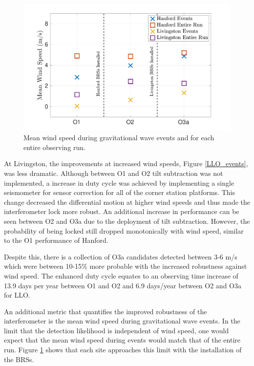 \documentclass [12pt, proquest]{uwthesis}[2019]
\begin{document}
\begin{figure}[!h]
\begin{center}
\includegraphics[width=\textwidth]{WindExpect.pdf}
\caption[Mean wind speed during GW events]{Mean wind speed during gravitational wave events and for each entire observing run.}
\label{WindExp}
\end{center}
\end{figure}

At Livingston, the improvements at increased wind speeds, Figure \ref{LLO_events}, was less dramatic. Although between O1 and O2 tilt subtraction was not implemented, a increase in duty cycle was achieved by implementing a single seismometer for sensor correction for all of the corner station platforms. This change decreased the differential motion at higher wind speeds and thus made the interferometer lock more robust. An additional increase in performance can be seen between O2 and O3a due to the deployment of tilt subtraction. However, the probability of being locked still dropped monotonically with wind speed, similar to the O1 performance of Hanford.

Despite this, there is a collection of O3a candidates detected between 3-6 m/s which were between 10-15\% more probable with the increased robustness against wind speed. The enhanced duty cycle equates to an observing time increase of 13.9 days per year between O1 and O2 and 6.9 days/year between O2 and O3a for LLO.

An additional metric that quantifies the improved robustness of the interferometer is the mean wind speed during gravitational wave events. In the limit that the detection likelihood is independent of wind speed, one would expect that the mean wind speed during events would match that of the entire run. Figure \ref{WindExp} shows that each site approaches this limit with the installation of the BRSs. 
\end{document}
